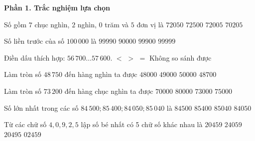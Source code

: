 \textbf{Phần 1. Trắc nghiệm lựa chọn}

\begin{ex} %
Số gồm $7$ chục nghìn, $2$ nghìn, $0$ trăm và $5$ đơn vị là
\choice
{$72050$}
{$72500$}
{\True $72005$}
{$70205$}
\end{ex}

\begin{ex} %
Số liền trước của số $100\,000$ là
\choice
{$99990$}
{$90000$}
{$99900$}
{\True $99999$}
\end{ex}

\begin{ex} %
Điền dấu thích hợp: $56\,700 \dots 57\,600$.
\choice
{\True $<$}
{$>$}
{$=$}
{Không so sánh được}
\end{ex}

\begin{ex} %
Làm tròn số $48\,750$ đến hàng nghìn ta được
\choice
{$48000$}
{\True $49000$}
{$50000$}
{$48700$}
\end{ex}

\begin{ex} %
Làm tròn số $73\,200$ đến hàng chục nghìn ta được
\choice
{\True $70000$}
{$80000$}
{$73000$}
{$75000$}
\end{ex}

\begin{ex} %
Số lớn nhất trong các số $84\,500; 85\,400; 84\,050; 85\,040$ là
\choice
{$84500$}
{\True $85400$}
{$85040$}
{$84050$}
\end{ex}

\begin{ex} %
Từ các chữ số $4, 0, 9, 2, 5$ lập số bé nhất có 5 chữ số khác nhau là
\choice
{\True $20459$}
{$24059$}
{$20495$}
{$02459$}
\end{ex}

